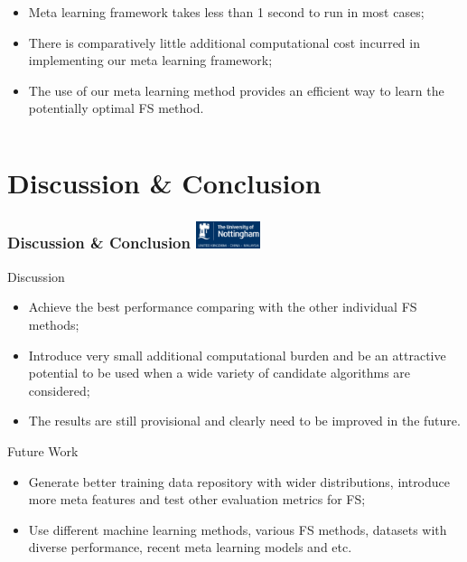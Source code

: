 \documentclass[aspectratio=1610]{beamer}
\newcommand{\UoN}
  {\hfill {\includegraphics[height=0.8cm]{nott_logo/nott_logo_white.png}}}
\begin{document}
\begin{frame}
\begin{columns}
	\begin{column}{0.4\textwidth}
		\begin{itemize}\small
			\item Meta learning framework takes less than 1 second to run in most cases;
			\vspace{0.4cm}
			\item There is comparatively little additional computational cost incurred in implementing our meta learning framework;
			\vspace{0.4cm}
			\item The use of our meta learning method provides an efficient way to learn the potentially optimal FS method.
		\end{itemize}
	\end{column}
\end{columns}
\end{frame}


\section{Discussion \& Conclusion}
\begin{frame}
\frametitle{Discussion \& Conclusion \UoN}
\begin{block}{Discussion}
	\begin{itemize}
		\item Achieve the best performance comparing with the other individual FS methods;
		\item Introduce very small additional computational burden and be an attractive potential to be used when a wide variety of candidate algorithms are considered;
		\item The results are still provisional and clearly need to be improved in the future.
	\end{itemize}
\end{block}

\begin{block}{Future Work}
	\begin{itemize}
		\item Generate better training data repository with wider distributions, introduce more meta features and test other evaluation metrics for FS;
		\item Use different machine learning methods, various FS methods, datasets with diverse performance, recent meta learning models and etc.
	\end{itemize}
\end{block}
\end{frame}
\end{document}
